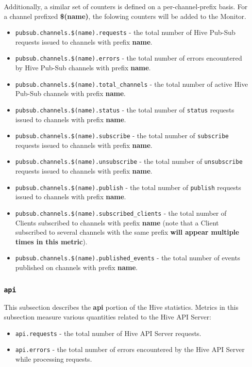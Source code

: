 \documentclass[a4paper]{article}
\begin{document}
\noindent
Additionally, a similar set of counters is defined on a per-channel-prefix basis. For a channel prefixed \textbf{\$(name)}, the folowing counters will be added to the Monitor.


\begin{itemize}
\item \texttt{pubsub.channels.\$(name).requests} - the total number of Hive Pub-Sub requests issued to channels with prefix \textbf{name}.
\item \texttt{pubsub.channels.\$(name).errors} - the total number of errors encountered by Hive Pub-Sub channels with prefix \textbf{name}.
\item \texttt{pubsub.channels.\$(name).total\_channels} - the total number of active Hive Pub-Sub channels with prefix \textbf{name}.
\item \texttt{pubsub.channels.\$(name).status} - the total number of \texttt{status} requests issued to channels with prefix \textbf{name}.
\item \texttt{pubsub.channels.\$(name).subscribe} - the total number of \texttt{subscribe} requests issued to channels with prefix \textbf{name}.
\item \texttt{pubsub.channels.\$(name).unsubscribe} - the total number of \texttt{unsubscribe} requests issued to channels with prefix \textbf{name}.
\item \texttt{pubsub.channels.\$(name).publish} - the total number of \texttt{publish} requests issued to channels with prefix \textbf{name}.
\item \texttt{pubsub.channels.\$(name).subscribed\_clients} - the total number of Clients subscribed to channels with prefix \textbf{name} (note that a Client subscribed to several channels with the same prefix \textbf{will appear multiple times in this metric}).
\item \texttt{pubsub.channels.\$(name).published\_events} - the total number of events published on channels with prefix \textbf{name}.
\end{itemize}
\subsubsection{\texttt{api}}
\label{sec-4-2-15}

This subsection describes the \textbf{api} portion of the Hive statistics. Metrics in this subsection measure various quantities related to the Hive API Server:


\begin{itemize}
\item \texttt{api.requests} - the total number of Hive API Server requests.
\item \texttt{api.errors} - the total number of errors encountered by the Hive API Server while processing requests.
\end{itemize}
\end{document}
